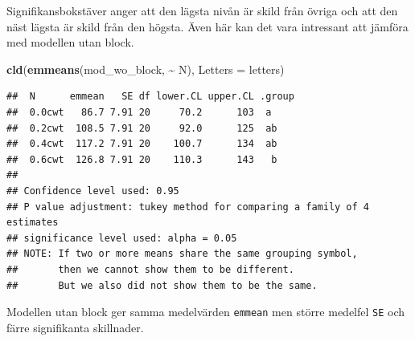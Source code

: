 \documentclass[
]{book}
\newenvironment{Shaded}{\begin{snugshade}}{\end{snugshade}}
\newcommand{\AttributeTok}[1]{\textcolor[rgb]{0.13,0.29,0.53}{#1}}
\newcommand{\FunctionTok}[1]{\textcolor[rgb]{0.13,0.29,0.53}{\textbf{#1}}}
\newcommand{\NormalTok}[1]{#1}
\newcommand{\SpecialCharTok}[1]{\textcolor[rgb]{0.81,0.36,0.00}{\textbf{#1}}}
\theoremstyle{definition}
\theoremstyle{definition}
\theoremstyle{definition}
\theoremstyle{definition}
\theoremstyle{remark}
\begin{document}
Signifikansbokstäver anger att den lägsta nivån är skild från övriga och att den näst lägsta är skild från den högsta. Även här kan det vara intressant att jämföra med modellen utan block.

\begin{Shaded}
\begin{Highlighting}[]
\FunctionTok{cld}\NormalTok{(}\FunctionTok{emmeans}\NormalTok{(mod\_wo\_block, }\SpecialCharTok{\textasciitilde{}}\NormalTok{ N), }\AttributeTok{Letters =}\NormalTok{ letters)}
\end{Highlighting}
\end{Shaded}

\begin{verbatim}
##  N      emmean   SE df lower.CL upper.CL .group
##  0.0cwt   86.7 7.91 20     70.2      103  a    
##  0.2cwt  108.5 7.91 20     92.0      125  ab   
##  0.4cwt  117.2 7.91 20    100.7      134  ab   
##  0.6cwt  126.8 7.91 20    110.3      143   b   
## 
## Confidence level used: 0.95 
## P value adjustment: tukey method for comparing a family of 4 estimates 
## significance level used: alpha = 0.05 
## NOTE: If two or more means share the same grouping symbol,
##       then we cannot show them to be different.
##       But we also did not show them to be the same.
\end{verbatim}

Modellen utan block ger samma medelvärden \texttt{emmean} men större medelfel \texttt{SE} och färre signifikanta skillnader.
\end{document}

